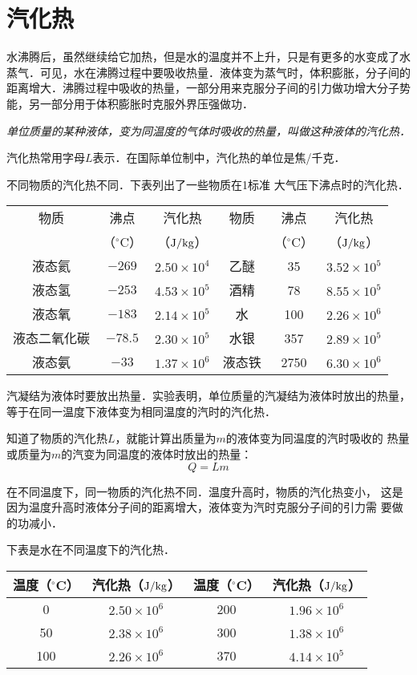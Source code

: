 \section{汽化热}
水沸腾后，虽然继续给它加热，但是水的温度并不上升，只是有更多的水变成了水蒸气．可见，水在沸腾过程中要吸收热量．液体变为蒸气时，体积膨胀，分子间的距离增大．沸腾过程中吸收的热量，一部分用来克服分子间的引力做功增大分子势能，另一部分用于体积膨胀时克服外界压强做功．

\textit{单位质量的某种液体，变为同温度的气体时吸收的热量，叫做这种液体的汽化热．}

汽化热常用字母$L$表示．在国际单位制中，汽化热的单位是焦/千克．

不同物质的汽化热不同．下表列出了一些物质在1标准
大气压下沸点时的汽化热．

\begin{center}
  \begin{tabular}{cccccc}
\hline
物质  & 沸点&汽化热&  物质  & 沸点 &汽化热\\
&（$^\circ$C）&（${\rm J}/{\rm kg}$）&& （$^\circ$C）&（${\rm J}/{\rm kg}$）\\
 \hline
液态氦 &$-269$& $2.50\times 10^4$ &乙醚 &35& $3.52\times 10^5$\\
液态氢&$-253$& $4.53\times 10^5$ &酒精&78& $8.55\times 10^5$\\
液态氧&$-183$& $2.14\times 10^5$ &水&100& $2.26\times 10^6$\\
液态二氧化碳&$-78.5$& $2.30\times 10^5$ &水银&357& $2.89\times 10^5$\\
液态氨&$-33$& $1.37\times 10^6$ &液态铁&2750& $6.30\times 10^6$\\
 \hline
\end{tabular}
\end{center}

汽凝结为液体时要放出热量．实验表明，单位质量的汽凝结为液体时放出的热量，
等于在同一温度下液体变为相同温度的汽时的汽化热．

知道了物质的汽化热$L$，就能计算出质量为$m$的液体变为同温度的汽时吸收的
热量或质量为$m$的汽变为同温度的液体时放出的热量：
\[Q=Lm\]

在不同温度下，同一物质的汽化热不同．温度升高时，物质的汽化热变小，
这是因为温度升高时液体分子间的距离增大，液体变为汽时克服分子间的引力需
要做的功减小．

下表是水在不同温度下的汽化热．

\begin{center}
\begin{tabular}{cccc}
\hline
温度（$^\circ$C）&汽化热（${\rm J}/{\rm kg}$）
&温度（$^\circ$C）&汽化热（${\rm J}/{\rm kg}$）\\
\hline
0& $2.50\times 10^6$ & 200 & $1.96\times 10^6$ \\
50& $2.38\times 10^6$ & 300 & $1.38\times 10^6$ \\
100& $2.26\times 10^6$ & 370 & $4.14\times 10^5$ \\
\hline
\end{tabular}
\end{center}

